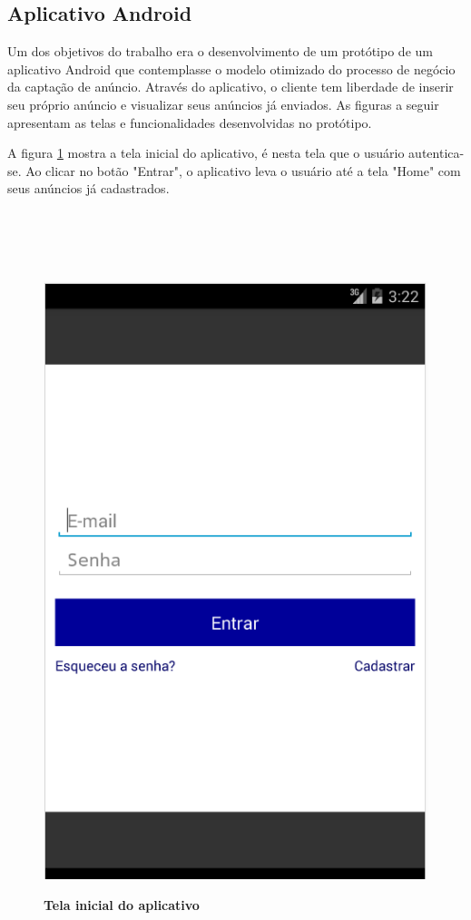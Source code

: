 \documentclass[
	12pt,				%
	openright,			%
	oneside,			%
	a4paper,			%
	chapter=TITLE,		%
	section=TITLE,		%
	english,			%
	french,				%
	spanish,			%
	brazil				%
	]{abntex2}
\begin{document}
\subsection{Aplicativo Android}

Um dos objetivos do trabalho era o desenvolvimento de um protótipo de um aplicativo Android que contemplasse o modelo otimizado do processo de negócio da captação de anúncio. Através do aplicativo, o cliente tem liberdade de inserir seu próprio anúncio e visualizar seus anúncios já enviados. As figuras a seguir apresentam as telas e funcionalidades desenvolvidas no protótipo.

A figura \ref{fig-android-login} mostra a tela inicial do aplicativo, é nesta tela que o usuário autentica-se. Ao clicar no botão "Entrar", o aplicativo leva o usuário até a tela "Home" com seus anúncios já cadastrados. \\ \\ \\ \\ \\

\begin{figure}[h]
	\begin{center}
		\caption{
			\textbf{Tela inicial do aplicativo}
		}\label{fig-android-login}
		\includegraphics [scale=0.6]{imagens/android-login.png}
		\label{fig-android-login}
	\end{center}
\end{figure}
\end{document}
